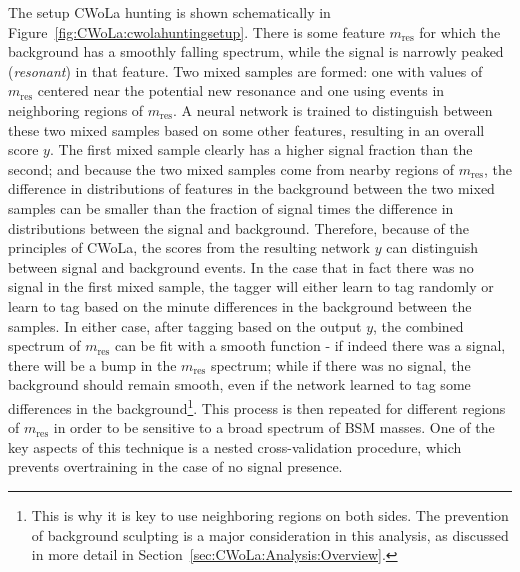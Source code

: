 The setup CWoLa hunting is shown schematically in Figure~\ref{fig:CWoLa:cwolahuntingsetup}.
There is some feature $m_\text{res}$ for which the background has a smoothly falling spectrum, while the signal is narrowly peaked (\textit{resonant}) in that feature.
Two mixed samples are formed: one with values of $m_\text{res}$ centered near the potential new resonance and one using events in neighboring regions of $m_\text{res}$.
A neural network is trained to distinguish between these two mixed samples based on some other features, resulting in an overall score $y$.
The first mixed sample clearly has a higher signal fraction than the second;
and because the two mixed samples come from nearby regions of $m_\text{res}$, the difference in distributions of features in the background between the two mixed samples can be smaller than the fraction of signal times the difference in distributions between the signal and background.
Therefore, because of the principles of CWoLa, the scores from the resulting network $y$ can distinguish between signal and background events. 
In the case that in fact there was no signal in the first mixed sample, the tagger will either learn to tag randomly or learn to tag based on the minute differences in the background between the samples.
In either case, after tagging based on the output $y$, the combined spectrum of $m_\text{res}$ can be fit with a smooth function - if indeed there was a signal, there will be a bump in the $m_\text{res}$ spectrum; while if there was no signal, the background should remain smooth, even if the network learned to tag some differences in the background\footnote{This is why it is key to use neighboring regions on both sides. The prevention of background sculpting is a major consideration in this analysis, as discussed in more detail in Section~\ref{sec:CWoLa:Analysis:Overview}.}.
This process is then repeated for different regions of $m_\text{res}$ in order to be sensitive to a broad spectrum of BSM masses.
One of the key aspects of this technique is a nested cross-validation procedure, which prevents overtraining in the case of no signal presence.


